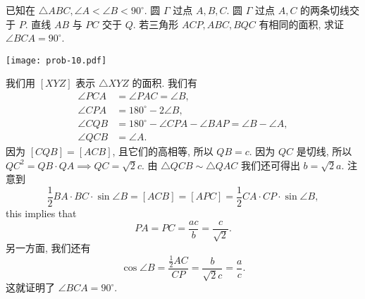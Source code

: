 \begin{prob}
\label{prob:prob-10}
已知在 $\triangle ABC, \angle A < \angle B < 90^\circ$.
圆 $\Gamma$ 过点 $A,B,C$. 圆 $\Gamma$ 过点 $A,C$ 的两条切线交于 $P$.
直线 $AB$ 与 $PC$ 交于 $Q$.
若三角形 $ACP, ABC, BQC$ 有相同的面积,
求证 $\angle BCA = 90^\circ$.
\end{prob}

\begin{center}
\texttt{[image: prob-10.pdf]}
\end{center}

\begin{soln}
我们用 $[XYZ]$ 表示 $\triangle XYZ$ 的面积. 我们有
\begin{equation}
\label{eq13}
\begin{aligned}
\angle PCA&=\angle PAC=\angle B,\\
\angle CPA&=180^\circ - 2\angle B,\\
\angle CQB&=180^\circ - \angle CPA-\angle BAP = \angle B - \angle A,\\
\angle QCB&=\angle A.
\end{aligned}
\end{equation}
因为 $[CQB] = [ACB]$, 且它们的高相等,
所以 $QB = c$. 因为 $QC$ 是切线,
所以 $QC^2 = QB\cdot QA \implies QC =\sqrt{2}c$.
由 $\triangle QCB \sim \triangle QAC$ 我们还可得出 $b = \sqrt{2}a$.
注意到
\[
\frac{1}{2}BA\cdot BC\cdot \sin\angle B = [ACB]
= [APC] = \frac{1}{2}CA\cdot CP\cdot \sin \angle B,
\]
this implies that
\[
PA = PC = \frac{ac}{b} = \frac{c}{\sqrt{2}}.
\]
另一方面, 我们还有
\[
\cos\angle B = \frac{\frac{1}{2}AC}{CP} =
\frac{b}{\sqrt{2}c} = \frac{a}{c}.
\]
这就证明了 $\angle BCA = 90^\circ$.
\end{soln}
